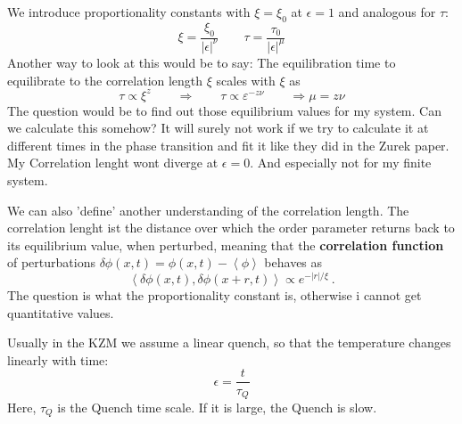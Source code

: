 	We introduce proportionality constants with $\xi =	\xi_0 $ at $\epsilon = 1$ and analogous for $\tau$:
	\begin{equation}
		\xi =	\frac{\xi_0}{|\epsilon|^\nu} \qquad \tau =	\frac{\tau_0}{|\epsilon|^\mu}
	\end{equation}
	Another way to look at this would be to say: The equilibration time to equilibrate to the correlation length $\xi$ scales with $\xi$ as
	\begin{equation}
		\tau \propto \xi^z \qquad \Rightarrow \qquad \tau \propto \varepsilon^{-z\nu} \qquad \Rightarrow \mu =	z \nu
	\end{equation}
	The question would be to find out those equilibrium values for my system. Can we calculate this somehow? It will surely not work if we try to calculate it at different times in the phase transition and fit it like they did in the Zurek paper. My Correlation lenght wont diverge at $\epsilon =	0$. And especially not for my finite system.
	
	We can also 'define' another understanding of the correlation length. The correlation lenght ist the distance over which the order parameter returns back to its equilibrium value, when perturbed, meaning that the \textbf{correlation function} of perturbations $\delta \phi(x,t) =	\phi(x,t) - \left\langle \phi \right\rangle $ behaves as
	\begin{equation}
		\left\langle \delta \phi(x,t), \delta \phi(x + r,t) \right\rangle \propto e^{- |r| / \xi}~.
	\end{equation}
	The question is what the proportionality constant is, otherwise i cannot get quantitative values.
	
	Usually in the KZM we assume a linear quench, so that the temperature changes linearly with time:
	\begin{equation}
		\epsilon =	\frac{t}{\tau_Q}
	\end{equation}
	Here, $\tau_Q$ is the Quench time scale. If it is large, the Quench is slow.
	
